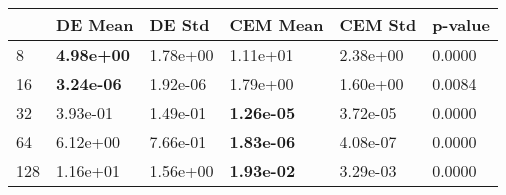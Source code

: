 \begin{tabular}{llllll}
\toprule
{} &            DE Mean &    DE Std &           CEM Mean &   CEM Std & p-value \\
\midrule
8   &  \textbf{4.98e+00} &  1.78e+00 &           1.11e+01 &  2.38e+00 &  0.0000 \\
16  &  \textbf{3.24e-06} &  1.92e-06 &           1.79e+00 &  1.60e+00 &  0.0084 \\
32  &           3.93e-01 &  1.49e-01 &  \textbf{1.26e-05} &  3.72e-05 &  0.0000 \\
64  &           6.12e+00 &  7.66e-01 &  \textbf{1.83e-06} &  4.08e-07 &  0.0000 \\
128 &           1.16e+01 &  1.56e+00 &  \textbf{1.93e-02} &  3.29e-03 &  0.0000 \\
\bottomrule
\end{tabular}
